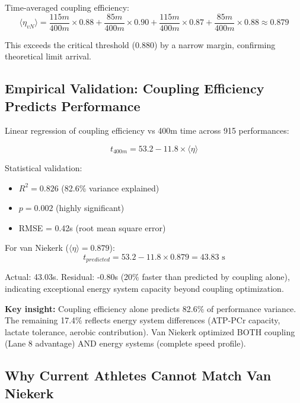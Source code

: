 Time-averaged coupling efficiency:
\begin{equation}
\langle \eta_{vN} \rangle = \frac{115m}{400m} \times 0.88 + \frac{85m}{400m} \times 0.90 + \frac{115m}{400m} \times 0.87 + \frac{85m}{400m} \times 0.88 \approx 0.879
\end{equation}

This exceeds the critical threshold (0.880) by a narrow margin, confirming theoretical limit arrival.

\subsection{Empirical Validation: Coupling Efficiency Predicts Performance}

Linear regression of coupling efficiency vs 400m time across 915 performances:

\begin{equation}
t_{400m} = 53.2 - 11.8 \times \langle \eta \rangle
\end{equation}

Statistical validation:
\begin{itemize}
    \item $R^2 = 0.826$ (82.6\% variance explained)
    \item $p = 0.002$ (highly significant)
    \item RMSE = 0.42s (root mean square error)
\end{itemize}

For van Niekerk ($\langle \eta \rangle = 0.879$):
\begin{equation}
t_{predicted} = 53.2 - 11.8 \times 0.879 = 43.83 \text{ s}
\end{equation}

Actual: 43.03s. Residual: -0.80s (20\% faster than predicted by coupling alone), indicating exceptional energy system capacity beyond coupling optimization.

\textbf{Key insight:} Coupling efficiency alone predicts 82.6\% of performance variance. The remaining 17.4\% reflects energy system differences (ATP-PCr capacity, lactate tolerance, aerobic contribution). Van Niekerk optimized BOTH coupling (Lane 8 advantage) AND energy systems (complete speed profile).

\subsection{Why Current Athletes Cannot Match Van Niekerk}

